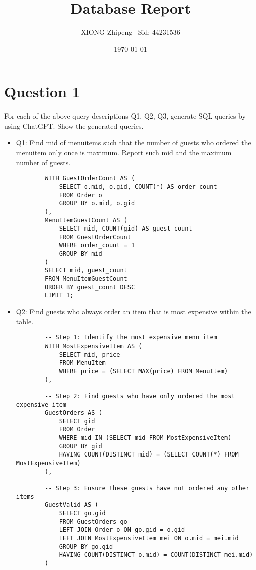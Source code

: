 \documentclass{article}
\title{Database Report}
\author{XIONG Zhipeng \  Sid: 44231536}
\date{\today}
\begin{document}
\maketitle

\section*{Question 1}
For each of the above query descriptions Q1, Q2, Q3, generate SQL queries by
using ChatGPT. Show the generated queries.

\begin{itemize}
    \item Q1: Find mid of menuitems such that the number of guests who ordered the menuitem
    only once is maximum. Report such mid and the maximum number of guests.
    \begin{verbatim}
        WITH GuestOrderCount AS (
            SELECT o.mid, o.gid, COUNT(*) AS order_count
            FROM Order o
            GROUP BY o.mid, o.gid
        ),
        MenuItemGuestCount AS (
            SELECT mid, COUNT(gid) AS guest_count
            FROM GuestOrderCount
            WHERE order_count = 1
            GROUP BY mid
        )
        SELECT mid, guest_count
        FROM MenuItemGuestCount
        ORDER BY guest_count DESC
        LIMIT 1;        
    \end{verbatim}
    \item Q2:  Find guests who always order an item that is most expensive within the table.
    \begin{verbatim}
        -- Step 1: Identify the most expensive menu item
        WITH MostExpensiveItem AS (
            SELECT mid, price
            FROM MenuItem
            WHERE price = (SELECT MAX(price) FROM MenuItem)
        ),

        -- Step 2: Find guests who have only ordered the most expensive item
        GuestOrders AS (
            SELECT gid
            FROM Order
            WHERE mid IN (SELECT mid FROM MostExpensiveItem)
            GROUP BY gid
            HAVING COUNT(DISTINCT mid) = (SELECT COUNT(*) FROM MostExpensiveItem)
        ),

        -- Step 3: Ensure these guests have not ordered any other items
        GuestValid AS (
            SELECT go.gid
            FROM GuestOrders go
            LEFT JOIN Order o ON go.gid = o.gid
            LEFT JOIN MostExpensiveItem mei ON o.mid = mei.mid
            GROUP BY go.gid
            HAVING COUNT(DISTINCT o.mid) = COUNT(DISTINCT mei.mid)
        )


\end{verbatim}
\end{itemize}
\end{document}
